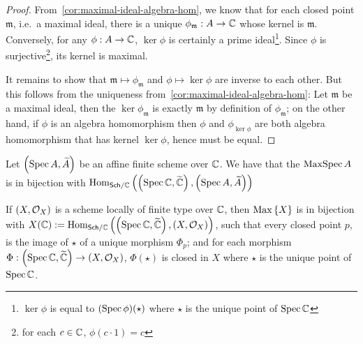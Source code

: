\begin{proof}
  From~\cref{cor:maximal-ideal-algebra-hom}, we know that for each closed point $\mathfrak m$, i.e.\ a maximal ideal, there is a unique $\phi_{\mathfrak m} : A \to \mathbb{C}$ whose kernel is $\mathfrak m$. Conversely, for any $\phi: A \to \mathbb{C}$, $\ker \phi$ is certainly a prime ideal\footnote{$\ker \phi$ is equal to $(\operatorname{Spec} \phi)(\star)$ where $\star$ is the unique point of $\operatorname{Spec}\mathbb{C}$}. Since $\phi$ is surjective\footnote{for each $c \in \mathbb{C}$, $\phi(c \cdot 1) = c$}, its kernel is maximal.


  It remains to show that $\mathfrak m \mapsto \phi_{\mathfrak{m}}$ and $\phi \mapsto \ker \phi$ are inverse to each other. But this follows from the uniqueness from~\cref{cor:maximal-ideal-algebra-hom}:
  Let $\mathfrak{m}$ be a maximal ideal, then the $\ker \phi_{\mathfrak{m}}$ is exactly $\mathfrak m$ by definition of $\phi_{\mathfrak m}$;
  on the other hand, if $\phi$ is an algebra homomorphism then $\phi$ and $\phi_{\ker \phi}$ are both algebra homomorphism that has kernel $\ker \phi$, hence must be equal.
\end{proof}

\begin{corollary}\label{cor:affine-closed-point-bijection-scheme-morphism}
  Let $\left(\operatorname*{Spec}{A}, \widetilde{A}\right)$ be an affine finite scheme over $\mathbb{C}$. We have that the $\operatorname{MaxSpec} A$ is in bijection with $\operatorname{Hom}_{\mathsf{Sch}/\mathbb{C}}\left(\left(\operatorname*{Spec}{\mathbb{C}}, \widetilde{\mathbb{C}}\right), \left(\operatorname*{Spec}{A}, \widetilde{A}\right)\right)$
\end{corollary}

\begin{proposition}
  If $\left(X, \mathcal{O}_{X}\right)$ is a scheme locally of finite type over $\mathbb{C}$, then $\operatorname{Max}\left\{X\right\}$ is in bijection with $X(\mathbb{C}) := \operatorname{Hom}_{\mathsf{Sch}/\mathbb{C}}\left(\left(\operatorname*{Spec}{\mathbb{C}}, \widetilde{\mathbb{C}}\right), \left(X, \mathcal{O}_{X}\right)\right)$,
  such that every closed point $p$, is the image of $\star$ of a unique morphism $\Phi_{p}$; and for each morphism $\Phi : \left(\operatorname*{Spec}{\mathbb{C}}, \widetilde{\mathbb{C}}\right)\to\left(X, \mathcal{O}_{X}\right)$, $\Phi(\star)$ is closed in $X$ where $\star$ is the unique point of $\operatorname{Spec}\mathbb{C}$.
\end{proposition}

